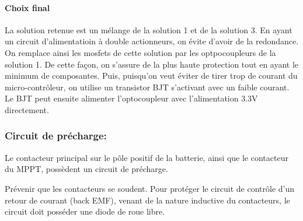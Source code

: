 		
		\paragraph*{Choix final}
		La solution retenue est un mélange de la solution 1 et de la solution 3. En ayant un circuit d'alimentatioin à double actionneurs, on évite d'avoir de la redondance. On remplace ainsi les mosfets de cette solution par les optpocoupleurs de la solution 1. De cette façon, on s'assure de la plus haute protection tout en ayant le minimum de composantes. Puis, puisqu'on veut éviter de tirer trop de courant du micro-contrôleur, on utilise un transistor BJT s'activant avec un faible courant. Le BJT peut ensuite alimenter l'optocoupleur avec l'alimentation 3.3V directement.




	\subsubsection*{Circuit de précharge:}
	
	Le contacteur principal sur le pôle positif de la batterie, ainsi que le contacteur du MPPT, possèdent un circuit de précharge.

	Prévenir que les contacteurs se soudent.
	Pour protéger le circuit de contrôle d'un retour de courant (back EMF), venant de la nature inductive du contacteurs, le circuit doit posséder une diode de roue libre. 


	
	

